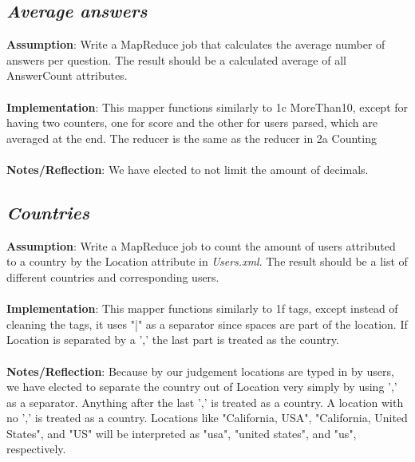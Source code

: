 \documentclass[fleqn,10pt]{wlscirep}
\begin{document}
\subsection{\emph{Average answers}}
\textbf{Assumption}: Write a MapReduce job that calculates the average number of answers per question. The result should be a calculated average of all AnswerCount attributes. \\ \\
\textbf{Implementation}: This mapper functions similarly to 1c MoreThan10, except for having two counters, one for score and the other for users parsed, which are averaged at the end. The reducer is the same as the reducer in 2a Counting \\ \\
\textbf{Notes/Reflection}: We have elected to not limit the amount of decimals.


\subsection{\emph{Countries}}
\textbf{Assumption}: Write a MapReduce job to count the amount of users attributed to a country by the Location attribute in \textit{Users.xml}. The result should be a list of different countries and corresponding users. \\ \\
\textbf{Implementation}: This mapper functions similarly to 1f tags, except instead of cleaning the tags, it uses "|" as a separator since spaces are part of the location. If Location is separated by a ',' the last part is treated as the country. \\ \\
\textbf{Notes/Reflection}: Because by our judgement locations are typed in by users, we have elected to separate the country out of Location very simply by using ',' as a separator. Anything after the last ',' is treated as a country. A location with no ',' is treated as a country. Locations like "California, USA", "California, United States", and "US" will be interpreted as "usa", "united states", and "us", respectively.

\end{document}
